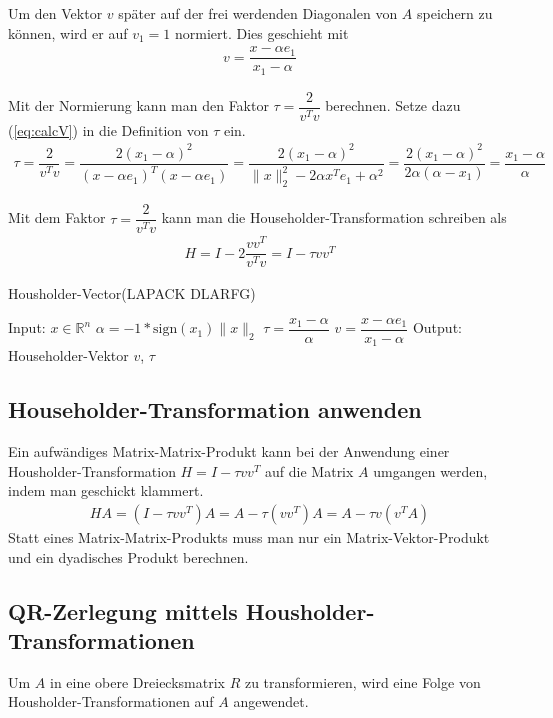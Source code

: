 Um den Vektor $v$ später auf der frei werdenden Diagonalen von $A$ speichern zu können, wird er auf $v_1 = 1$ normiert. Dies geschieht mit 
\begin{align}
v = \dfrac{x - \alpha e_1}{x_1 - \alpha}
\label{eq:calcV}
\end{align}

Mit der Normierung kann man den Faktor $\tau = \dfrac{2}{v^Tv}$ berechnen. Setze dazu (\ref{eq:calcV}) in die Definition von $\tau$ ein.
\begin{align*}
\tau = \dfrac{2}{v^Tv} = \dfrac{2 (x_1 - \alpha)^2}{(x - \alpha e_1)^T (x - \alpha e_1)} = \dfrac{2 (x_1 - \alpha)^2}{\|x\|^2_2 - 2\alpha x^Te_1 + \alpha^2} =  \dfrac{2 (x_1 - \alpha)^2}{ 2\alpha (\alpha - x_1)} = \dfrac{x_1 - \alpha}{\alpha}
\end{align*}

Mit dem Faktor $\tau = \dfrac{2}{v^Tv}$ kann man die Householder-Transformation schreiben als
\begin{align*}
	H = I - 2 \dfrac{vv^T}{v^Tv} = I - \tau v v^T
\end{align*}



\begin{algorithm}
	\caption{Housholder-Vector(LAPACK DLARFG)}
	\begin{algorithmic}
		\State Input: $x \in \mathbb{R}^n$ 
		\State $\alpha = -1 * \text{sign}(x_1) \|x\|_2$
		\State $\tau = \dfrac{x_1 - \alpha}{\alpha}$
		\State $v=\dfrac{x - \alpha e_1}{x_1 - \alpha}$
		\State Output: Householder-Vektor $v$, $\tau$
	\end{algorithmic} 
	\label{alg:unblockedqr}
\end{algorithm}


\subsection{Householder-Transformation anwenden}
Ein aufwändiges Matrix-Matrix-Produkt kann bei der Anwendung einer Housholder-Transformation $H = I - \tau vv^T$ auf die Matrix $A$ umgangen werden, indem man geschickt klammert.
\begin{align*} 
H A =(I - \tau vv^T) A= A - \tau (vv^T )A = A - \tau v(v^TA)
\end{align*}
Statt eines Matrix-Matrix-Produkts muss man nur ein Matrix-Vektor-Produkt und ein dyadisches Produkt berechnen.

\subsection{QR-Zerlegung mittels Housholder-Transformationen}
Um $A$ in eine obere Dreiecksmatrix $R$ zu transformieren, wird eine Folge von Housholder-Transformationen auf $A$ angewendet.

